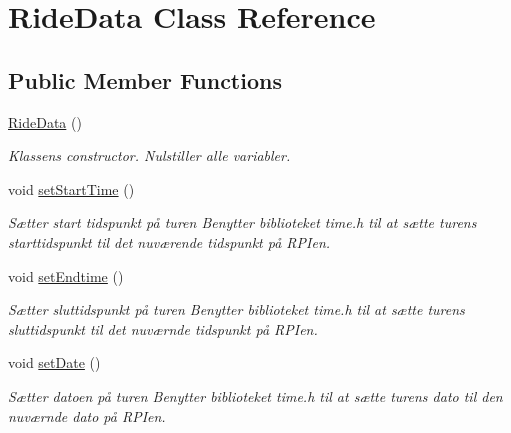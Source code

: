 \hypertarget{classRideData}{}\section{Ride\+Data Class Reference}
\label{classRideData}
\subsection*{Public Member Functions}
\begin{DoxyCompactItemize}
\item 
\mbox{\label{classRideData_a74b3ac8999a7d0cb153e16fee0831161}} 
\hyperlink{classRideData_a74b3ac8999a7d0cb153e16fee0831161}{Ride\+Data} ()
\begin{DoxyCompactList}\small\item\em Klassens constructor. Nulstiller alle variabler. \end{DoxyCompactList}\item 
\mbox{\label{classRideData_a9c7f9d737269d475ec544079993a021e}} 
void \hyperlink{classRideData_a9c7f9d737269d475ec544079993a021e}{set\+Start\+Time} ()
\begin{DoxyCompactList}\small\item\em Sætter start tidspunkt på turen Benytter biblioteket time.\+h til at sætte turens starttidspunkt til det nuværende tidspunkt på R\+PI\textquotesingle{}en. \end{DoxyCompactList}\item 
\mbox{\label{classRideData_af99bbf3658597b735fb9635ee00bb699}} 
void \hyperlink{classRideData_af99bbf3658597b735fb9635ee00bb699}{set\+Endtime} ()
\begin{DoxyCompactList}\small\item\em Sætter sluttidspunkt på turen Benytter biblioteket time.\+h til at sætte turens sluttidspunkt til det nuværnde tidspunkt på R\+PI\textquotesingle{}en. \end{DoxyCompactList}\item 
\mbox{\label{classRideData_a8664eef8bdd2942e8b18d24fbfe202f1}} 
void \hyperlink{classRideData_a8664eef8bdd2942e8b18d24fbfe202f1}{set\+Date} ()
\begin{DoxyCompactList}\small\item\em Sætter datoen på turen Benytter biblioteket time.\+h til at sætte turens dato til den nuværnde dato på R\+PI\textquotesingle{}en. \end{DoxyCompactList}\item 

\end{DoxyCompactItemize}
